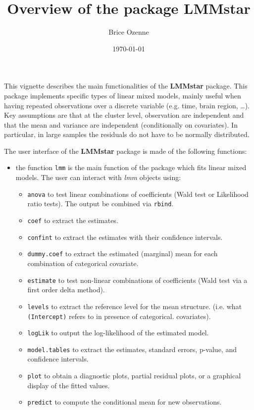 \documentclass[12pt]{article}
\author{Brice Ozenne}
\date{\today}
\title{Overview of the package LMMstar}
\begin{document}
\maketitle
This vignette describes the main functionalities of the \textbf{LMMstar}
package. This package implements specific types of linear mixed
models, mainly useful when having repeated observations over a
discrete variable (e.g. time, brain region, \ldots{}). Key assumptions are
that at the cluster level, observation are independent and that the
mean and variance are independent (conditionally on covariates). In
particular, in large samples the residuals do not have to be normally
distributed.

\bigskip

The user interface of the \textbf{LMMstar} package is made of the following functions:
\begin{itemize}
\item the function \texttt{lmm} is the main function of the package which fits
linear mixed models. The user can interact with \emph{lmm} objects using:
\begin{itemize}
\item \texttt{anova} to test linear combinations of coefficients (Wald test
or Likelihood ratio tests). \newline The output be combined via \texttt{rbind}.
\item \texttt{coef} to extract the estimates.
\item \texttt{confint} to extract the estimates with their confidence intervals.
\item \texttt{dummy.coef} to extract the estimated (marginal) mean for each combination of categorical covariate.
\item \texttt{estimate} to test non-linear combinations of coefficients (Wald test via a first order delta method).
\item \texttt{levels} to extract the reference level for the mean structure.
(i.e. what \texttt{(Intercept)} refers to in presence of categorical.
covariates).
\item \texttt{logLik} to output the log-likelihood of the estimated model.
\item \texttt{model.tables} to extract the estimates, standard errors, p-value, and confidence intervals.
\item \texttt{plot} to obtain a diagnostic plots, partial residual plots, or a graphical display of the fitted values.
\item \texttt{predict} to compute the conditional mean for new observations.

\end{itemize}
\end{itemize}
\end{document}
